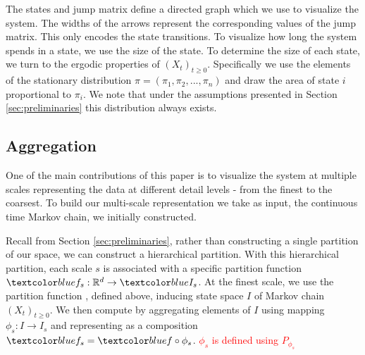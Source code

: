 The states and jump matrix define a directed graph which we use to visualize the system. The widths of the arrows represent the corresponding values of the jump matrix. This only encodes the state transitions. To visualize how long the system spends in a state, we use the size of the state.
To determine the size of each state, we turn to the ergodic properties of $(X_t)_{t \ge 0}$. Specifically
we use the elements of the stationary distribution $\pi = (\pi_1, \pi_2, ..., \pi_n)$ and draw the area of
state $i$ proportional to $\pi_i$. We note that under the assumptions presented in Section \ref{sec:preliminaries}
this distribution always exists.  


\subsection{Aggregation}
\label{sec:framework-aggregation}

One of the main contributions of this paper is to visualize the system at multiple scales  representing
the data at different detail levels - from the finest to the coarsest. To build our multi-scale representation we take as input, the continuous time Markov chain, we initially constructed. 

Recall from Section \ref{sec:preliminaries}, rather than constructing a single partition of our space, we can construct a hierarchical partition. With this hierarchical partition,  each scale $s$ is associated with a specific partition
function $\lstopar{f_s}: \mathbb{R}^d \rightarrow \lstopar{I_s}$. At the finest scale, we use the partition function , defined above, inducing state space $I$ of Markov chain $(X_t)_{t \ge 0}$. 
We then compute  by aggregating elements of $I$ using mapping  $\phi_s: I \rightarrow I_s$ and representing  as a composition $\lstopar{f_s} = \lstopar{f} \circ \phi_s$. \textcolor{red}{$\phi_s$ is defined using $P_{\phi_s}$} 

